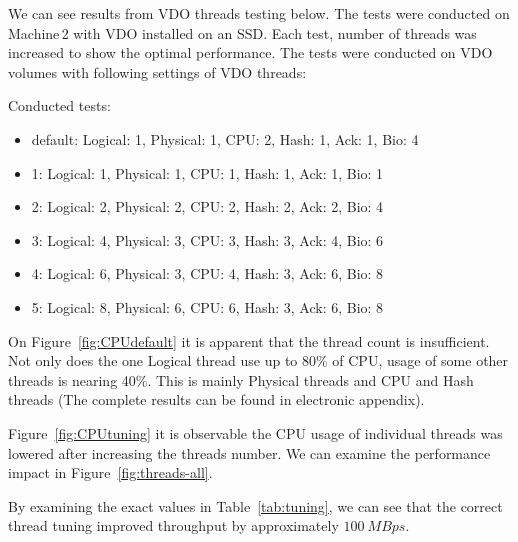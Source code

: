 \documentclass[
  color, %
  table, %
  lof,   %
  lot,   %
]{fithesis3}
\begin{document}
We can see results from VDO threads testing below. The tests were conducted on Machine\,2 with VDO installed on an SSD. Each test, number of threads was increased to show the optimal performance. The tests were conducted on VDO volumes with following settings of VDO threads:

Conducted tests:
\begin{itemize}
    \item default: Logical: 1, Physical: 1, CPU: 2, Hash: 1, Ack: 1, Bio: 4
    \item 1: Logical: 1, Physical: 1, CPU: 1, Hash: 1, Ack: 1, Bio: 1
    \item 2: Logical: 2, Physical: 2, CPU: 2, Hash: 2, Ack: 2, Bio: 4
    \item 3: Logical: 4, Physical: 3, CPU: 3, Hash: 3, Ack: 4, Bio: 6
    \item 4: Logical: 6, Physical: 3, CPU: 4, Hash: 3, Ack: 6, Bio: 8
    \item 5: Logical: 8, Physical: 6, CPU: 6, Hash: 3, Ack: 6, Bio: 8
\end{itemize}

On Figure~\ref{fig:CPUdefault} it is apparent that the thread count is insufficient. Not only does the one Logical thread use up to 80\% of CPU, usage of some other threads is nearing 40\%. This is mainly Physical threads and CPU and Hash threads (The complete results can be found in electronic appendix).

Figure~\ref{fig:CPUtuning} it is observable the CPU usage of individual threads was lowered after increasing the threads number. We can examine the performance impact in Figure~\ref{fig:threads-all}.

By examining the exact values in Table~\ref{tab:tuning}, we can see that the correct thread tuning improved throughput by approximately $\SI{100}{MBps}$.
\end{document}
